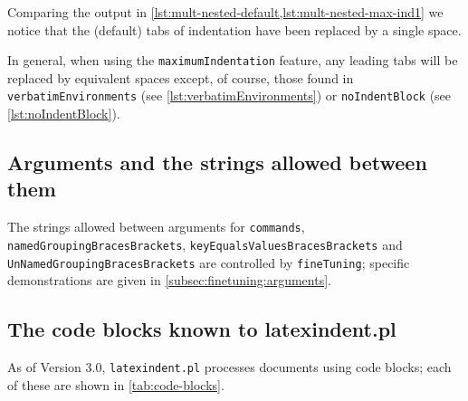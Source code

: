  Comparing the output in \cref{lst:mult-nested-default,lst:mult-nested-max-ind1} we
 notice that the (default) tabs of indentation have been replaced by a single space.

 In general, when using the \texttt{maximumIndentation} feature, any leading tabs will be
 replaced by equivalent spaces except, of course, those found in
 \texttt{verbatimEnvironments} (see \vref{lst:verbatimEnvironments}) or
 \texttt{noIndentBlock} (see \vref{lst:noIndentBlock}).

\subsection{Arguments and the strings allowed between them}
 The strings allowed between arguments for \texttt{commands}, \texttt{namedGroupingBracesBrackets},
 \texttt{keyEqualsValuesBracesBrackets} and \texttt{UnNamedGroupingBracesBrackets}
 are controlled by \texttt{fineTuning}; specific demonstrations are given in \vref{subsec:finetuning:arguments}.

\subsection{The code blocks known to latexindent.pl}\label{subsubsec:code-blocks}

 As of Version 3.0, \texttt{latexindent.pl} processes documents using code blocks; each
 of these are shown in \cref{tab:code-blocks}.    

